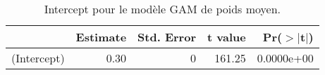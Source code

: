 \begin{table}[!ht]
\centering
\begin{tabular}{rrrrr}
  \hline
 & Estimate & Std. Error & t value & Pr($>$$|$t$|$) \\ 
  \hline
(Intercept) & 0.30 &    0 & 161.25 & 0.0000e+00 \\ 
   \hline
\end{tabular}
\caption{Intercept pour le modèle GAM de poids moyen.} 
\label{smpm.pc}
\end{table}
